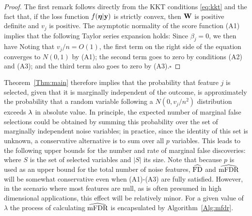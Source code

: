 \begin{proof}
  The first remark follows directly from the KKT conditions \eqref{eq:kkt} and the fact that, if the loss function $f(\boldsymbol{\eta}|\mathbf{y})$ is strictly convex, then $\mathbf{W}$ is positive definite and $v_j$ is positive.  The asymptotic normality of the score function (A1) implies that the following Taylor series expansion holds:
Since $\beta_j=0$, we then have
Noting that $v_j/n=O(1)$, the first term on the right side of the equation converges to $N(0,1)$ by (A1); the second term goes to zero by conditions (A2) and (A3); and the third term also goes to zero by (A3).\hfill$\square$
\end{proof}

Theorem~\ref{Thm:main} therefore implies that the probability that feature $j$ is selected, given that it is marginally independent of the outcome, is approximately the probability that a random variable following a $N(0, v_j/n^2)$ distribution exceeds $\lambda$ in absolute value.
In principle, the expected number of marginal false selections could be obtained by summing this probability over the set of marginally independent noise variables; in practice, since the identity of this set is unknown, a conservative alternative is to sum over all $p$ variables.
This leads to the following upper bounds for the number and rate of marginal false discoveries:
where $S$ is the set of selected variables and $|S|$ its size.  Note that because $p$ is used as an upper bound for the total number of noise features, $\widehat{\textrm{FD}}$ and $\widehat{\textrm{mFDR}}$ will be somewhat conservative even when (A1)-(A3) are fully satisfied.  However, in the scenario where most features are null, as is often presumed in high dimensional applications, this effect will be relatively minor.  For a given value of $\lambda$ the process of calculating $\widehat{\textrm{mFDR}}$ is encapsulated by Algorithm~\ref{Alg:mfdr}.



